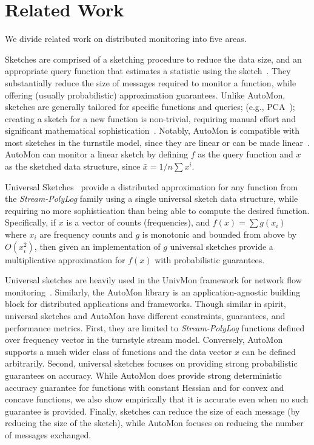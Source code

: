 \section{Related Work} \label{sec:related_work}


We divide related work on distributed monitoring into five areas.

Sketches are comprised of a sketching procedure to reduce the data size, and an appropriate query function that estimates a statistic using the sketch~\cite{2007_rusu_statistical_analysis_of_sketch_estimators}.
They substantially reduce the size of messages required to monitor a function, while offering 
(usually probabilistic) approximation guarantees.
Unlike AutoMon, sketches are generally tailored for specific functions and queries; (e.g., PCA~\cite{Huang2020jmlr});
creating a sketch for a new function is non-trivial, requiring manual effort and significant mathematical sophistication~\cite{2013_opensketch,univmon_2016, liu2021sketchy}.
%
Notably, AutoMon is compatible with most sketches in the turnstile model, since they are linear or can be made linear~\cite{Li_2014_Turnstile}.
AutoMon can monitor a linear sketch by defining $f$ as the query function and $x$ as the sketched data structure, since $\bar{x} = 1/n \sum x^i$.

%
Universal Sketches~\cite{zero_one_frequency_laws} provide a distributed approximation for any function from the \emph{Stream-PolyLog} family using a single universal sketch data structure, while requiring no more sophistication than being able to compute the desired function.
Specifically, if $x$ is a vector of counts (frequencies), and $f(x) = \sum g(x_i)$ where $x_i$ are frequency counts and $g$ is monotonic and bounded from above by $O(x_i^2)$, then given an implementation of $g$ universal sketches provide a multiplicative approximation for $f(x)$ with probabilistic guarantees.

Universal sketches are heavily used in the UnivMon framework for network flow monitoring~\cite{univmon_2016}. Similarly, the AutoMon library is an application-agnostic building block for distributed applications and frameworks.
%
Though similar in spirit, universal sketches and AutoMon have different constraints, guarantees, and performance metrics.
First, they are limited to \emph{Stream-PolyLog} functions defined over frequency vector in the turnstyle stream model.
Conversely, AutoMon supports a much wider class of functions and the data vector $x$ can be defined arbitrarily.
Second, universal sketches focuses on providing strong probabilistic guarantees on accuracy.
While AutoMon does provide strong deterministic accuracy guarantee for functions with constant Hessian and for convex and concave functions, we also show empirically that it is accurate even when no such guarantee is provided.
Finally, sketches can reduce the size of each message (by reducing the size of the sketch), while AutoMon focuses on reducing the number of messages exchanged.


